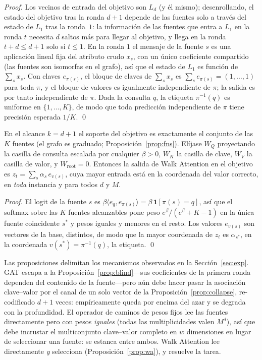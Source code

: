 \begin{proof}
Los vecinos de entrada del objetivo son $L_d$ (y él mismo); desenrollando, el
estado del objetivo tras la ronda $d{+}1$ depende de las fuentes solo a través
del estado de $L_1$ tras la ronda~$1$: la información de las fuentes que entra
a $L_1$ en la ronda $t$ necesita $d$ saltos más para llegar al objetivo, y
llega en la ronda $t+d\le d+1$ solo si $t\le1$. En la ronda $1$ el mensaje de
la fuente $s$ es una aplicación lineal fija del atributo crudo $x_s$, con un
único coeficiente compartido (las fuentes son isomorfas en el grafo), así que
el estado de $L_1$ es función de $\sum_s x_s$. Con claves $e_{\pi(s)}$, el
bloque de claves de $\sum_s x_s$ es $\sum_s e_{\pi(s)}=(1,\dots,1)$ para toda
$\pi$, y el bloque de valores es igualmente independiente de $\pi$; la salida
es por tanto independiente de $\pi$. Dada la consulta $q$, la etiqueta
$\pi^{-1}(q)$ es uniforme en $\{1,\dots,K\}$, de modo que toda predicción
independiente de $\pi$ tiene precisión esperada $1/K$. \qed
\end{proof}

\begin{proposition}\label{prop:wa}
En el alcance $k=d{+}1$ el soporte del objetivo es exactamente el conjunto de
las $K$ fuentes (el grafo es graduado; Proposición~\ref{prop:fns}). Elíjase
$W_Q$ proyectando la casilla de consulta escalada por cualquier $\beta>0$,
$W_K$ la casilla de clave, $W_V$ la casilla de valor, y $W_{\!\text{root}}=0$.
Entonces la salida de Walk Attention en el objetivo es
$z_t=\sum_s \alpha_s\,e_{v(s)}$, cuya mayor entrada está en la coordenada del
valor correcto, en \emph{toda} instancia y para todos $d$ y $M$.
\end{proposition}

\begin{proof}
El logit de la fuente $s$ es $\beta\langle e_q, e_{\pi(s)}\rangle
=\beta\,\mathbf{1}[\pi(s)=q]$, así que el softmax sobre las $K$ fuentes
alcanzables pone peso $e^{\beta}/(e^{\beta}+K-1)$ en la única fuente
coincidente $s^\ast$ y pesos iguales y menores en el resto. Los valores
$e_{v(s)}$ son vectores de la base, distintos, de modo que la mayor coordenada
de $z_t$ es $\alpha_{s^\ast}$, en la coordenada $v(s^\ast)=\pi^{-1}(q)$, la
etiqueta. \qed
\end{proof}

\begin{remark}\label{rem:mechanisms}
Las proposiciones delimitan los mecanismos observados en la
Sección~\ref{sec:exp}. GAT escapa a la Proposición~\ref{prop:blind}---sus
coeficientes de la primera ronda dependen del contenido de la fuente---pero
aún debe hacer pasar la asociación clave--valor por el canal de un solo vector
de la Proposición~\ref{prop:collapse}, re-codificado $d{+}1$ veces:
empíricamente queda por encima del azar y se degrada con la profundidad. El
operador de caminos de pesos fijos lee las fuentes directamente pero con pesos
\emph{iguales} (todas las multiplicidades valen $M^{d}$), así que debe
incrustar el multiconjunto clave--valor completo en $w$ dimensiones en lugar
de seleccionar una fuente: se estanca entre ambos. Walk Attention lee
directamente \emph{y} selecciona (Proposición~\ref{prop:wa}), y resuelve la
tarea.
\end{remark}
